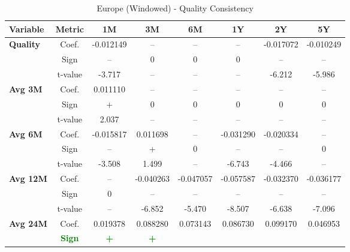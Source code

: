 \documentclass[11pt,english,a4paper,hidelinks]{book}
\begin{document}
\begin{table}[H]
    \centering
    \caption{Europe (Windowed) - Quality Consistency}
    \begin{tabular}{lccccccc}
        \toprule
        \textbf{Variable} & \textbf{Metric} & \textbf{1M} & \textbf{3M} & \textbf{6M} & \textbf{1Y} & \textbf{2Y} & \textbf{5Y} \\
        \midrule
        \multirow{3}{*}{\textbf{Quality}}
            & Coef.   & -0.012149 & --        & --        & --        & -0.017072 & -0.010249 \\
            & Sign    & –         & 0         & 0         & 0         & –         & –         \\
            & t-value & -3.717    & --        & --        & --        & -6.212    & -5.986    \\
        \cmidrule{1-8}
        \multirow{3}{*}{\textbf{Avg 3M}}
            & Coef.   & 0.011110  & --        & --        & --        & --        & --        \\
            & Sign    & +         & 0         & 0         & 0         & 0         & 0         \\
            & t-value & 2.037     & --        & --        & --        & --        & --        \\
        \cmidrule{1-8}
        \multirow{3}{*}{\textbf{Avg 6M}}
            & Coef.   & -0.015817 & 0.011698  & --        & -0.031290 & -0.020334 & --        \\
            & Sign    & –         & +         & 0         & –         & –         & 0         \\
            & t-value & -3.508    & 1.499     & --        & -6.743    & -4.466    & --        \\
        \cmidrule{1-8}
        \multirow{3}{*}{\textbf{Avg 12M}}
            & Coef.   & --        & -0.040263 & -0.047057 & -0.057587 & -0.032370 & -0.036177 \\
            & Sign    & 0         & – & – & – & – & – \\
            & t-value & --        & -6.852 & -5.470 & -8.507 & -6.638 & -7.096 \\
        \cmidrule{1-8}
        \multirow{3}{*}{\textbf{Avg 24M}}
            & Coef.   & 0.019378  & 0.088280  & 0.073143  & 0.086730  & 0.099170  & 0.046953  \\
            & \textbf{\textcolor{green}{Sign}}
                     & \textbf{\textcolor{green}{+}}
                     & \textbf{\textcolor{green}{+}}

\end{tabular}
\end{table}
\end{document}
